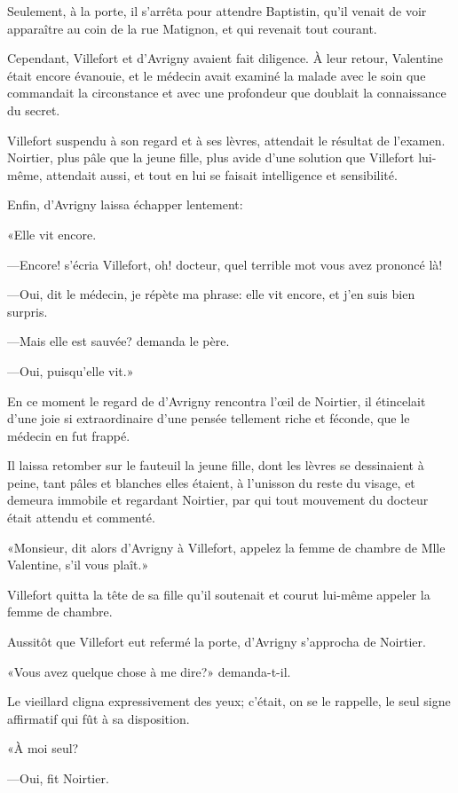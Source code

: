 Seulement, à la porte, il s'arrêta pour attendre Baptistin, qu'il venait de voir apparaître au coin de la rue Matignon, et qui revenait tout courant. 

Cependant, Villefort et d'Avrigny avaient fait diligence. À leur retour, Valentine était encore évanouie, et le médecin avait examiné la malade avec le soin que commandait la circonstance et avec une profondeur que doublait la connaissance du secret. 

Villefort suspendu à son regard et à ses lèvres, attendait le résultat de l'examen. Noirtier, plus pâle que la jeune fille, plus avide d'une solution que Villefort lui-même, attendait aussi, et tout en lui se faisait intelligence et sensibilité. 

Enfin, d'Avrigny laissa échapper lentement: 

«Elle vit encore. 

—Encore! s'écria Villefort, oh! docteur, quel terrible mot vous avez prononcé là! 

—Oui, dit le médecin, je répète ma phrase: elle vit encore, et j'en suis bien surpris. 

—Mais elle est sauvée? demanda le père. 

—Oui, puisqu'elle vit.» 

En ce moment le regard de d'Avrigny rencontra l'œil de Noirtier, il étincelait d'une joie si extraordinaire d'une pensée tellement riche et féconde, que le médecin en fut frappé. 

Il laissa retomber sur le fauteuil la jeune fille, dont les lèvres se dessinaient à peine, tant pâles et blanches elles étaient, à l'unisson du reste du visage, et demeura immobile et regardant Noirtier, par qui tout mouvement du docteur était attendu et commenté. 

«Monsieur, dit alors d'Avrigny à Villefort, appelez la femme de chambre de Mlle Valentine, s'il vous plaît.» 

Villefort quitta la tête de sa fille qu'il soutenait et courut lui-même appeler la femme de chambre. 

Aussitôt que Villefort eut refermé la porte, d'Avrigny s'approcha de Noirtier. 

«Vous avez quelque chose à me dire?» demanda-t-il. 

Le vieillard cligna expressivement des yeux; c'était, on se le rappelle, le seul signe affirmatif qui fût à sa disposition. 

«À moi seul? 

—Oui, fit Noirtier. 

